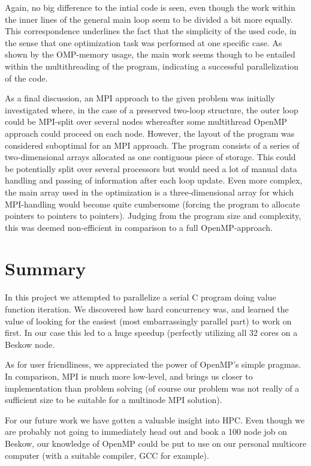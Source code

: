 \documentclass[12pt]{article}
\begin{document}
Again, no big difference to the intial code is seen, even though the work within the inner lines of the general main loop seem to be divided a bit more equally. This correspondence underlines the fact that the simplicity of the used code, in the sense that one optimization task was performed at one specific case. As shown by the OMP-memory usage, the main work seems though to be entailed within the multithreading of the program, indicating a successful parallelization of the code. 

As a final discussion, an MPI approach to the given problem was initially investigated where, in the case of a preserved two-loop structure, the outer loop could be MPI-split over several nodes whereafter some multithread OpenMP approach could proceed on each node. However, the layout of the program was considered suboptimal for an MPI approach. The program consists of a series of two-dimensional arrays allocated as one contiguous piece of storage. This could be potentially split over several processors but would need a lot of manual data handling and passing of information after each loop update. Even more complex, the main array used in the optimization is a three-dimensional array for which MPI-handling would become quite cumbersome (forcing the program to allocate pointers to pointers to pointers). Judging from the program size and complexity, this was deemed non-efficient in comparison to a full OpenMP-approach.

 \section*{Summary}
In this project we attempted to parallelize a serial C program doing value function iteration. We discovered how hard concurrency was, and learned the value of looking for the easiest (most embarrassingly parallel part) to work on first. In our case this led to a huge speedup (perfectly utilizing all 32 cores on a Beskow node. 

As for user friendliness, we appreciated the power of OpenMP's simple pragmas. In comparison, MPI is much more low-level, and brings us closer to implementation than problem solving (of course our problem was not really of a sufficient size to be suitable for a multinode MPI solution).

For our future work we have gotten a valuable insight into HPC. Even though we are probably not going to immediately head out and  book a 100 node job on Beskow, our knowledge of OpenMP could be put to use on our personal multicore computer (with a suitable compiler, GCC for example).
\end{document}
